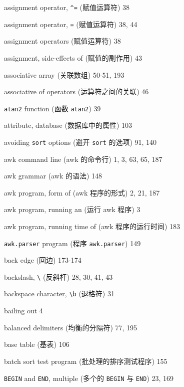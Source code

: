 \begin{multicols}{3}
\hangindent=3pc  assignment operator, \verb'^=' (赋值运算符) 38

\hangindent=3pc  assignment operator, \verb'=' (赋值运算符) 38, 44

\hangindent=3pc  assignment operators (赋值运算符) 38

\hangindent=3pc  assignment, side-effects of (赋值的副作用) 43

\hangindent=3pc  associative array (关联数组) 50-51, 193

\hangindent=3pc  associative of operators (运算符之间的关联) 46

\hangindent=3pc  \verb'atan2' function (函数 \verb'atan2') 39

\hangindent=3pc  attribute, database (数据库中的属性) 103

\hangindent=3pc  avoiding \verb'sort' options (避开 \verb'sort'
的选项) 91, 140

\hangindent=3pc  awk command line (awk 的命令行) 1, 3, 63, 65, 187

\hangindent=3pc  awk grammar (awk 的语法) 148

\hangindent=3pc  awk program, form of (awk 程序的形式) 2, 21, 187

\hangindent=3pc  awk program, running an (运行 awk 程序) 3

\hangindent=3pc  awk program, running time of (awk
程序的运行时间) 183

\hangindent=3pc  \verb'awk.parser' program (程序
\verb'awk.parser') 149

\hangindent=3pc  back edge (回边) 173-174

\hangindent=3pc  backslash, \verb'\' (反斜杆) 28, 30, 41, 43

\hangindent=3pc  backspace character, \verb'\b' (退格符) 31

\hangindent=3pc  bailing out 4

\hangindent=3pc  balanced delimiters (均衡的分隔符) 77, 195

\hangindent=3pc  base table (基表) 106

\hangindent=3pc  batch sort test program (批处理的排序测试程序) 155

\hangindent=3pc  \verb'BEGIN' and \verb'END', multiple (多个的
\verb'BEGIN' 与 \verb'END') 23, 169


\end{multicols}
